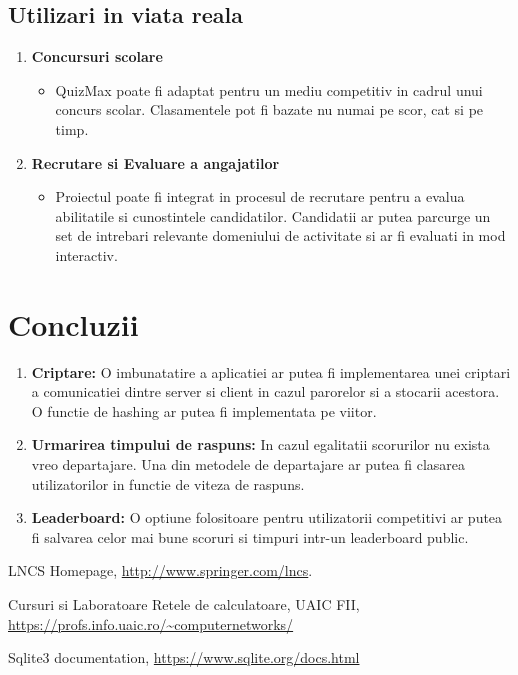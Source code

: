 \documentclass[runningheads]{llncs}
\begin{document}
\subsection{Utilizari in viata reala}
\begin{enumerate}
    \item \textbf{Concursuri scolare}
        \begin{itemize}[label=$\bullet$]
            \item QuizMax poate fi adaptat pentru un mediu competitiv in cadrul unui concurs scolar. Clasamentele pot fi bazate nu numai pe scor, cat si pe timp.
        \end{itemize}
    \item \textbf{Recrutare si Evaluare a angajatilor}
        \begin{itemize}[label=$\bullet$]
            \item Proiectul poate fi integrat in procesul de recrutare pentru a evalua abilitatile si cunostintele candidatilor. Candidatii ar putea parcurge un set de intrebari relevante domeniului de activitate si ar fi evaluati in mod interactiv.
        \end{itemize}
\end{enumerate}

\section{Concluzii}
\begin{enumerate}
    \item \textbf{Criptare:} O imbunatatire a aplicatiei ar putea fi implementarea unei criptari a comunicatiei dintre server si client in cazul parorelor si a stocarii acestora. O functie de hashing ar putea fi implementata pe viitor.
    \item \textbf{Urmarirea timpului de raspuns:} In cazul egalitatii scorurilor nu exista vreo departajare. Una din metodele de departajare ar putea fi clasarea utilizatorilor in functie de viteza de raspuns.
    \item \textbf{Leaderboard:} O optiune folositoare pentru utilizatorii competitivi ar putea fi salvarea celor mai bune scoruri si timpuri intr-un leaderboard public.
\end{enumerate}

%
%
\begin{thebibliography}{8}

LNCS Homepage, \url{http://www.springer.com/lncs}. 

Cursuri si Laboratoare Retele de calculatoare, UAIC FII, \url{https://profs.info.uaic.ro/~computernetworks/}

Sqlite3 documentation, \url{https://www.sqlite.org/docs.html}

\end{thebibliography}
\end{document}
